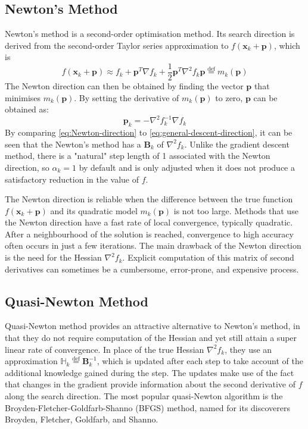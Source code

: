 \subsection{Newton's Method}
Newton's method is a second-order optimisation method. Its search direction is derived from the second-order Taylor series approximation to $f(\textbf{x}_k+\textbf{p})$, which is
\begin{equation}
  f(\textbf{x}_k+\textbf{p}) \approx f_k + \textbf{p}^T \nabla f_k + \frac{1}{2}\textbf{p}^T \nabla^2 f_k \textbf{p} \stackrel{\text{def}}{=}m_k(\textbf{p})
\end{equation}
The Newton direction can then be obtained by finding the vector $\textbf{p}$ that minimises $m_k(\textbf{p})$. By setting the derivative of $m_k(\textbf{p})$ to zero, $\textbf{p}$ can be obtained as:
\begin{equation}
  \textbf{p}_k=-\nabla^2 f_k^{-1}\nabla f_k \label{eq:Newton-direction}
\end{equation}
By comparing \cref{eq:Newton-direction} to \cref{eq:general-descent-direction}, it can be seen that the Newton's method has a $\textbf{B}_k$ of $\nabla^2 f_k$. Unlike the gradient descent method, there is a "natural" step length of 1 associated with the Newton direction, so $\alpha_k = 1$ by default and is only adjusted when it does not produce a satisfactory reduction in the value of $f$.

The Newton direction is reliable when the difference between the true function $f(\textbf{x}_k+\textbf{p})$ and its quadratic model $m_k(\textbf{p})$ is not too large. Methods that use the Newton direction have a fast rate of local convergence, typically quadratic. After a neighbourhood of the solution is reached, convergence to high accuracy often occurs in just a few iterations. The main drawback of the Newton direction is the need for the Hessian $\nabla^2 f_k$. Explicit computation of this matrix of second derivatives can sometimes be a cumbersome, error-prone, and expensive process. \cite{Nocedal2006}



\subsection{Quasi-Newton Method}\label{sec:BFGS}
Quasi-Newton method provides an attractive alternative to Newton's method, in that they do not require computation of the Hessian and yet still attain a super linear rate of convergence. In place of the true Hessian $\nabla^2 f_k$, they use an approximation $\mathbb{H}_k \stackrel{\text{def}}{=} \textbf{B}_k^{-1}$, which is updated after each step to take account of the additional knowledge gained during the step. The updates make use of the fact that changes in the gradient provide information about the second derivative of $f$ along the search direction. The most popular quasi-Newton algorithm is the Broyden-Fletcher-Goldfarb-Shanno (BFGS) method, named for its discoverers Broyden, Fletcher, Goldfarb, and Shanno. \cite{Nocedal2006}


